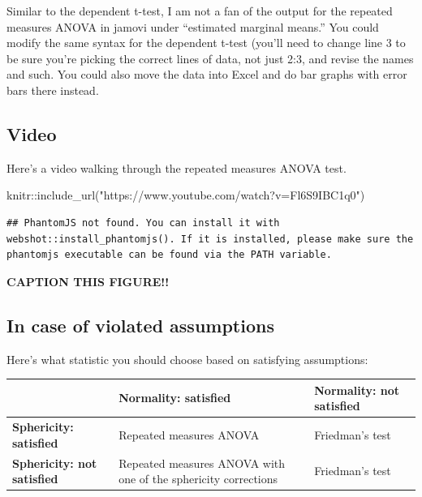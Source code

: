 \documentclass[
]{book}
\newenvironment{Shaded}{\begin{snugshade}}{\end{snugshade}}
\newcommand{\FunctionTok}[1]{\textcolor[rgb]{0.00,0.00,0.00}{#1}}
\newcommand{\NormalTok}[1]{#1}
\newcommand{\SpecialCharTok}[1]{\textcolor[rgb]{0.00,0.00,0.00}{#1}}
\newcommand{\StringTok}[1]{\textcolor[rgb]{0.31,0.60,0.02}{#1}}
\begin{document}
Similar to the dependent t-test, I am not a fan of the output for the repeated measures ANOVA in jamovi under ``estimated marginal means.'' You could modify the same syntax for the dependent t-test (you'll need to change line 3 to be sure you're picking the correct lines of data, not just 2:3, and revise the names and such. You could also move the data into Excel and do bar graphs with error bars there instead.

\hypertarget{video-7}{%
\subsection{Video}\label{video-7}}

Here's a video walking through the repeated measures ANOVA test.

\begin{Shaded}
\begin{Highlighting}[]
\NormalTok{knitr}\SpecialCharTok{::}\FunctionTok{include\_url}\NormalTok{(}\StringTok{"https://www.youtube.com/watch?v=Fl6S9IBC1q0"}\NormalTok{)}
\end{Highlighting}
\end{Shaded}

\begin{verbatim}
## PhantomJS not found. You can install it with webshot::install_phantomjs(). If it is installed, please make sure the phantomjs executable can be found via the PATH variable.
\end{verbatim}

\label{fig:unnamed-chunk-1}\textbf{CAPTION THIS FIGURE!!}

\hypertarget{in-case-of-violated-assumptions-6}{%
\subsection{In case of violated assumptions}\label{in-case-of-violated-assumptions-6}}

Here's what statistic you should choose based on satisfying assumptions:

\begin{longtable}[]{@{}
  >{\raggedright\arraybackslash}p{}
  >{\raggedright\arraybackslash}p{}
  >{\raggedright\arraybackslash}p{}@{}}
\toprule
& \textbf{Normality: satisfied} & \textbf{Normality: not satisfied} \\
\midrule
\endhead
\textbf{Sphericity: satisfied} & Repeated measures ANOVA & Friedman's test \\
\textbf{Sphericity: not satisfied} & Repeated measures ANOVA with one of the sphericity corrections & Friedman's test \\
\bottomrule
\end{longtable}
\end{document}

